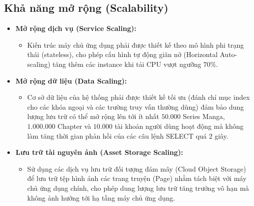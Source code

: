 \subsection{Khả năng mở rộng (Scalability)}
\label{subsec:nfr_scalability}
\begin{itemize}
    \item \textbf{Mở rộng dịch vụ (Service Scaling):}
    \begin{itemize}
        \item Kiến trúc máy chủ ứng dụng phải được thiết kế theo mô hình phi trạng thái (stateless), cho phép cấu hình tự động giãn nở (Horizontal Auto-scaling) tăng thêm các instance khi tải CPU vượt ngưỡng $70\%$.
    \end{itemize}
    \item \textbf{Mở rộng dữ liệu (Data Scaling):}
    \begin{itemize}
        \item Cơ sở dữ liệu của hệ thống phải được thiết kế tối ưu (đánh chỉ mục index cho các khóa ngoại và các trường truy vấn thường dùng) đảm bảo dung lượng lưu trữ có thể mở rộng lên tới ít nhất $50.000$ Series Manga, $1.000.000$ Chapter và $10.000$ tài khoản người dùng hoạt động mà không làm tăng thời gian phản hồi của các câu lệnh SELECT quá $2$ giây.
    \end{itemize}
    \item \textbf{Lưu trữ tài nguyên ảnh (Asset Storage Scaling):}
    \begin{itemize}
        \item Sử dụng các dịch vụ lưu trữ đối tượng đám mây (Cloud Object Storage) để lưu trữ tệp hình ảnh các trang truyện (Page) nhằm tách biệt với máy chủ ứng dụng chính, cho phép dung lượng lưu trữ tăng trưởng vô hạn mà không ảnh hưởng tới hạ tầng máy chủ ứng dụng.
    \end{itemize}
\end{itemize}


